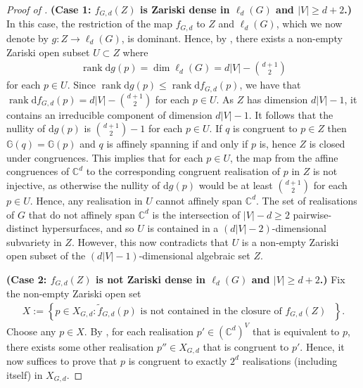 \documentclass[ALCO]{cedram}
\DeclareMathOperator{\rank}{rank}
\newcommand{\diff}{\mathrm{d}}
\begin{document}
\begin{proof}[Proof of ]
	\textbf{(Case 1: $f_{G,d}(Z)$ is Zariski dense in $\ell_d(G)$ and $|V| \geq d+2$.)}
	In this case,
	the restriction of the map $f_{G,d}$ to $Z$ and $\ell_d(G)$, which we now denote by $g : Z \rightarrow \ell_d(G)$, is dominant.
	Hence, by ,
	there exists a non-empty Zariski open subset $U \subset Z$ where 
	\begin{align*}
		\rank \diff g(p) = \dim \ell_d(G) = d|V|- \binom{d+1}{2}
	\end{align*}
	for each $p \in U$.
	Since $\rank \diff g(p) \leq \rank \diff f_{G,d}(p)$,
	we have that $\rank \diff f_{G,d}(p) = d|V| - \binom{d+1}{2}$ for each $p \in U$.
	As $Z$ has dimension $d|V|-1$,
	it contains an irreducible component of dimension $d|V|-1$.
	It follows that the nullity of $\diff g(p)$ is $\binom{d+1}{2} - 1$ for each $p \in U$.	
	If $q$ is congruent to $p \in Z$ then $\mathbb{G}(q) = \mathbb{G}(p)$ and $q$ is affinely spanning if and only if $p$ is,
	hence $Z$ is closed under congruences.
	This implies that for each $p \in U$,
	the map from the affine congruences of $\mathbb{C}^d$ to the corresponding congruent realisation of $p$ in $Z$ is not injective,
	as otherwise the nullity of $\diff g(p)$ would be at least $\binom{d+1}{2}$ for each $p \in U$.
	Hence, any realisation in $U$ cannot affinely span $\mathbb{C}^d$.
	The set of realisations of $G$ that do not affinely span $\mathbb{C}^d$ is the intersection of $|V| - d \geq 2$ pairwise-distinct hypersurfaces,
	and so $U$ is contained in a $(d|V|-2)$-dimensional subvariety in $Z$.
	However, this now contradicts that $U$ is a non-empty Zariski open subset of the $(d|V|-1)$-dimensional algebraic set $Z$.
	
	
	\textbf{(Case 2: $f_{G,d}(Z)$ is not Zariski dense in $\ell_d(G)$ and $|V| \geq d+2$.)}
	Fix the non-empty Zariski open set
	\begin{align*}
		X := \left\{ p \in X_{G,d} : \tilde{f}_{G,d}(p) \text{ is not contained in the closure of $f_{G,d}(Z)$ }   \right\}.
	\end{align*}
	Choose any $p \in X$.
	By , for each realisation $p' \in (\mathbb{C}^d)^V$ that is equivalent to $p$,
	there exists some other realisation $p'' \in X_{G,d}$ that is congruent to $p'$.
	Hence, it now suffices to prove that $p$ is congruent to exactly $2^d$ realisations (including itself) in $X_{G,d}$.
	

\end{proof}
\end{document}
